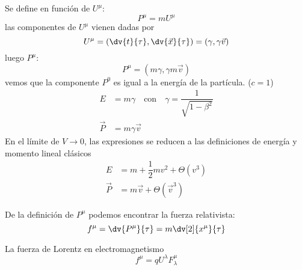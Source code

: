 \documentclass[../main]{subfiles}
\begin{document}
\begin{adjustwidth}{0pt}{-100pt}
 Se define en función de $U^{\mu}$:
\begin{equation}
    P^{\mu}=mU^{\mu}
\end{equation}
las componentes de $U^{\mu}$ vienen dadas por 
\begin{equation}
    U^{\mu}=\left(\dv{t}{\tau}, \dv{\vec{x}}{\tau}\right)=(\gamma, \gamma \vec{v})
\end{equation}
luego $P^{\mu}$:
\begin{equation}
    P^{\mu}=(m\gamma, \gamma m\vec{v})
\end{equation}
vemos que la componente $P^0$ es igual a la energía de la partícula. ($c=1$)
\begin{equation}
    \begin{aligned}
        E&=m\gamma \quad \text{con} \quad \gamma=\dfrac{1}{\sqrt{1-\beta^2}} \\
        \vec{P}&=m\gamma \vec{v}
    \end{aligned}
\end{equation}
En el límite de $V\rightarrow 0$, las expresiones se reducen a las definiciones de energía y momento lineal clásicos 
\begin{equation}
    \begin{aligned}
        E&=m+\dfrac{1}{2}mv^2+\Theta(v^3) \\
        \vec{P}&=m\vec{v}+\Theta(\vec{v}^3)
    \end{aligned}
\end{equation}

 De la definición de $P^{\mu}$ podemos encontrar la fuerza relativista:
\begin{equation}
    f^{\mu}=\dv{P^{\mu}}{\tau}=m\dv[2]{x^{\mu}}{\tau}
\end{equation}

\ejemplo{} La fuerza de Lorentz en electromagnetismo
\begin{equation}
    f^{\mu}=qU^{\lambda} F^{\mu}_{\lambda}
\end{equation}



\end{adjustwidth}
\end{document}
